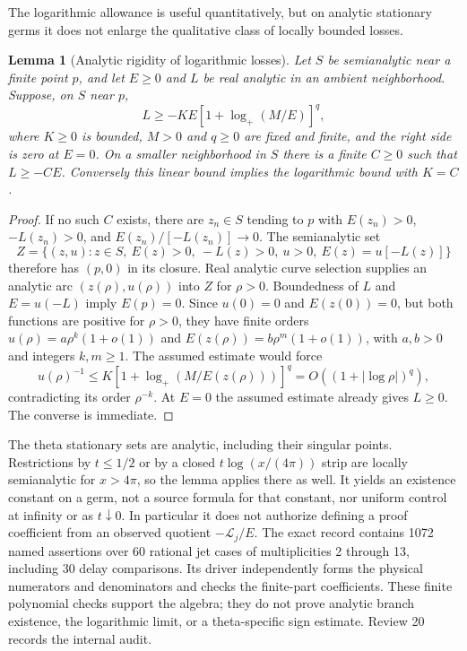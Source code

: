 \documentclass[11pt]{article}
\numberwithin{equation}{section}
\newtheorem{lemma}[theorem]{Lemma}
\theoremstyle{definition}
\theoremstyle{remark}
\newcommand{\Lag}{\mathcal L}
\begin{document}
The logarithmic allowance is useful quantitatively, but on analytic
stationary germs it does not enlarge the qualitative class of locally
bounded losses.
\begin{lemma}[Analytic rigidity of logarithmic losses]
\label{lem:analytic-log-rigidity}
Let $S$ be semianalytic near a finite point $p$, and let $E\ge0$ and
$L$ be real analytic in an ambient neighborhood.  Suppose, on $S$ near
$p$,
\[
 L\ge-K E[1+\log_+(M/E)]^q,
\]
where $K\ge0$ is bounded, $M>0$ and $q\ge0$ are fixed and finite,
and the right side is zero at $E=0$.  On a smaller neighborhood in $S$
there is a finite $C\ge0$ such that $L\ge-CE$.  Conversely this
linear bound implies the logarithmic bound with $K=C$.
\end{lemma}
\begin{proof}
If no such $C$ exists, there are $z_n\in S$ tending to $p$ with
$E(z_n)>0$, $-L(z_n)>0$, and $E(z_n)/[-L(z_n)]\to0$.
The semianalytic set
\[
 Z=\{(z,u):z\in S,\ E(z)>0,\ -L(z)>0,\ u>0,
                     \ E(z)=u[-L(z)]\}
\]
therefore has $(p,0)$ in its closure.  Real analytic curve selection
\cite[(7.2), p.~40]{ruiz} supplies an analytic arc
$(z(\rho),u(\rho))$ into $Z$ for $\rho>0$.  Boundedness of $L$
and $E=u(-L)$ imply $E(p)=0$.  Since $u(0)=0$ and
$E(z(0))=0$, but both functions are positive for $\rho>0$, they have
finite orders
$u(\rho)=a\rho^k(1+o(1))$ and
$E(z(\rho))=b\rho^m(1+o(1))$, with $a,b>0$ and integers
$k,m\ge1$.  The assumed estimate would force
\[
 u(\rho)^{-1}\le K[1+\log_+(M/E(z(\rho)))]^q
                  =O((1+|\log\rho|)^q),
\]
contradicting its order $\rho^{-k}$.  At $E=0$ the assumed estimate
already gives $L\ge0$.  The converse is immediate.
\end{proof}

The theta stationary sets are analytic, including their singular points.
Restrictions by $t\le1/2$ or by a closed $t\log(x/(4\pi))$ strip
are locally semianalytic for $x>4\pi$, so the lemma applies there as
well.  It yields an existence constant on a germ, not a source formula
for that constant, nor uniform control at infinity or as $t\downarrow0$.
In particular it does not authorize defining a proof coefficient from
an observed quotient $-\Lag_j/E$.
The exact record
 contains
1072 named assertions over 60 rational jet cases of multiplicities
2 through 13, including 30 delay comparisons.  Its driver
 independently forms the
physical numerators and denominators and checks the finite-part
coefficients.  These finite polynomial checks support the algebra;
they do not prove analytic branch existence, the logarithmic limit, or
a theta-specific sign estimate.  Review 20 records the internal audit.
\end{document}
